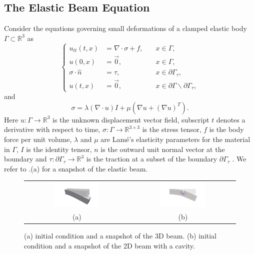 \subsection{The Elastic Beam Equation} \label{sec:res.1}
Consider the equations governing small deformations of a clamped elastic body $\Gamma\subset \mathbb R^{3}$ as 
\begin{equation} \label{eq:res.1}
\left\{
\begin{aligned}
	u_{tt}(t,x) &= \nabla \cdot \sigma + f, \quad & x\in \Gamma, \\
	u(0,x) &= \vec 0, & x\in \Gamma,\\
	\sigma \cdot \hat n &= \tau, & x \in \partial \Gamma_\tau,\\
	u(t,x) &= \vec 0, & x \in\partial \Gamma \backslash \partial \Gamma_\tau,
\end{aligned}
\right.
\end{equation}
and
\begin{equation}  \label{eq:res.2}
	\sigma = \lambda (\nabla \cdot u) I + \mu(\nabla u + (\nabla u)^T).
\end{equation}
Here $u:\Gamma \to \mathbb{R}^3$ is the unknown displacement vector field, subscript $t$ denotes a derivative with respect to time, $\sigma:\Gamma \to \mathbb{R}^{3\times 3}$ is the stress tensor, $f$ is the body force per unit volume, $\lambda$ and $\mu$ are Lam\'e's elasticity parameters for the material in $\Gamma$, $I$ is the identity tensor, $n$ is the outward unit normal vector at the boundary and $\tau:\partial \Gamma_\tau \to \mathbb R^3$ is the traction at a subset of the boundary $\partial \Gamma_\tau$ \cite{langtangen2017solving}. We refer to .(a) for a snapshot of the elastic beam.

\begin{figure}[t] 
\begin{tabular}{cc}
\includegraphics[width=0.45\textwidth]{./images/paper2/beam3d.png} & \includegraphics[width=0.45\textwidth]{./images/paper2/beam2d.png} \\
(a) & (b)
\end{tabular}
\caption{(a) initial condition and a snapshot of the 3D beam. (b) initial condition and a snapshot of the 2D beam with a cavity. } \label{fig:0}
\end{figure}

